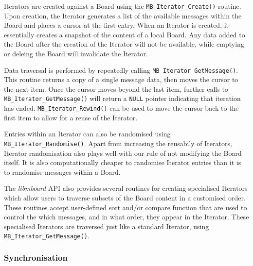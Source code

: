 Iterators are created against a Board using the \texttt{MB\_Iterator\_Create()} routine. Upon creation, the Iterator generates a list of the available messages within the Board and places a cursor at the first entry. When an Iterator is created, it essentially creates a snapshot of the content of a local Board. Any data added to the Board after the creation of the Iterator will not be available, while emptying or deleing the Board will invalidate the Iterator.

Data traversal is performed by repeatedly calling \texttt{MB\_Iterator\_GetMessage()}. This routine returns a copy of a single message data, then moves the cursor to the next item. Once the cursor moves beyond the last item, further calls to \texttt{MB\_Iterator\_GetMessage()} will return a \texttt{NULL} pointer indicating that iteration has ended. \texttt{MB\_Iterator\_Rewind()} can be used to move the cursor back to the first item to allow for a reuse of the Iterator.


Entries within an Iterator can also be randomised using \texttt{MB\_Iterator\_Randomise()}. Apart from increasing the reusabily of Iterators, Iterator randomisation also plays well with our rule of not modifying the Board itself. It is also computationally cheaper to randomise Iterator entries than it is to randomise messages within a Board.

The \textit{libmboard} API also provides several routines for creating specialised Iterators which allow users to traverse subsets of the Board content in a customised order. These routines accept user-defined sort and/or compare function that are used to control the which messages, and in what order, they appear in the Iterator. These specialised Iterators are traversed just like a standard Iterator, using \texttt{MB\_Iterator\_GetMessage()}.


\subsubsection{Synchronisation}
\label{sec:mb_sync}

